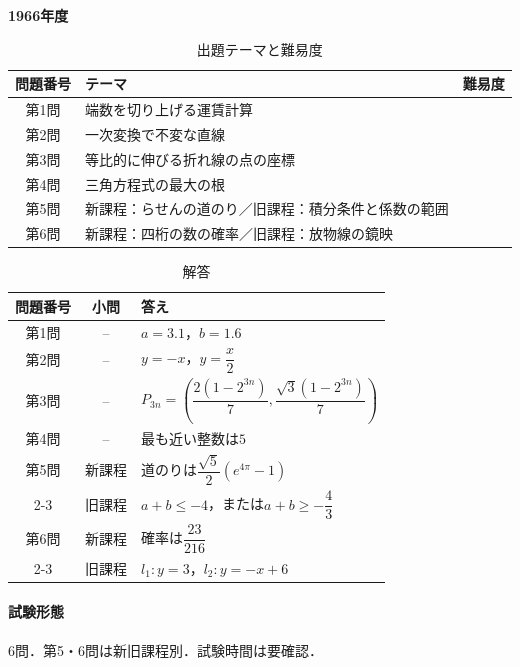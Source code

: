 \documentclass[../../main.tex]{subfiles}
\begin{document}
\begin{center}
  {\fontsize{48pt}{58pt}\selectfont \textbf{1966}\normalsize\textbf{年度}}
\end{center}

\begin{table}[htb]
  \centering
  \caption{出題テーマと難易度}
  \begin{tabular}{|c|p{9cm}|c|}
    \hline
    \textbf{問題番号} & \textbf{テーマ} & \textbf{難易度} \\
    \hline
    第1問 & 端数を切り上げる運賃計算 & \\
    \hline
    第2問 & 一次変換で不変な直線 & \\
    \hline
    第3問 & 等比的に伸びる折れ線の点の座標 & \\
    \hline
    第4問 & 三角方程式の最大の根 & \\
    \hline
    第5問 & 新課程：らせんの道のり／旧課程：積分条件と係数の範囲 & \\
    \hline
    第6問 & 新課程：四桁の数の確率／旧課程：放物線の鏡映 & \\
    \hline
  \end{tabular}
\end{table}

\begin{table}[htb]
  \centering
  \caption{解答}
  \renewcommand{\arraystretch}{1.4}
  \begin{tabular}{|c|c|p{9cm}|}
    \hline
    \textbf{問題番号} & \textbf{小問} & \textbf{答え} \\
    \hline
    第1問 & -- & $a=3.1$，$b=1.6$ \\
    \hline
    第2問 & -- & $y=-x$，$y=\dfrac{x}{2}$ \\
    \hline
    第3問 & -- & $P_{3n}=\left(\dfrac{2(1-2^{3n})}{7},\dfrac{\sqrt{3}(1-2^{3n})}{7}\right)$ \\
    \hline
    第4問 & -- & 最も近い整数は$5$ \\
    \hline
    第5問 & 新課程 & 道のりは$\dfrac{\sqrt{5}}{2}(e^{4\pi}-1)$ \\
    \cline{2-3}
    & 旧課程 & $a+b\le-4$，または$a+b\ge-\dfrac{4}{3}$ \\
    \hline
    第6問 & 新課程 & 確率は$\dfrac{23}{216}$ \\
    \cline{2-3}
    & 旧課程 & $l_1:y=3$，$l_2:y=-x+6$ \\
    \hline
  \end{tabular}
\end{table}

\paragraph{試験形態}
6問．第5・6問は新旧課程別．試験時間は要確認．
\end{document}
